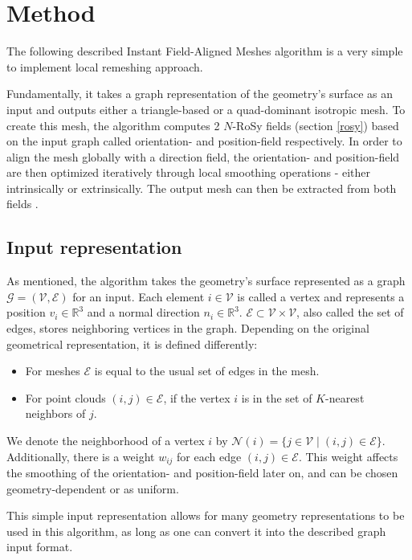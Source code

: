 \documentclass{ACGSeminar}
\begin{document}
\section{Method}\label{algorithm}
The following described Instant Field-Aligned Meshes algorithm is a very simple to implement local remeshing approach.

Fundamentally, it takes a graph representation of the geometry's surface as an input and outputs either a triangle-based or a quad-dominant isotropic mesh. To create this mesh, the algorithm computes 2 $N$-RoSy fields (section \ref{rosy}) based on the input graph called orientation- and position-field respectively. In order to align the mesh globally with a direction field, the orientation- and position-field are then optimized iteratively through local smoothing operations - either intrinsically or extrinsically. The output mesh can then be extracted from both fields \cite{jakob2015instant}.

\subsection{Input representation}
As mentioned, the algorithm takes the geometry's surface represented as a graph $\mathcal{G} = (\mathcal{V}, \mathcal{E})$ for an input. Each element $i \in \mathcal{V}$ is called a vertex and represents a position $v_i \in \mathbb{R}^3$ and a normal direction $n_i \in \mathbb{R}^3$. $\mathcal{E} \subset \mathcal{V} \times \mathcal{V}$, also called the set of edges, stores neighboring vertices in the graph. Depending on the original geometrical representation, it is defined differently:
\begin{itemize}
	\item	For meshes $\mathcal{E}$ is equal to the usual set of edges in the mesh.
	\item	For point clouds $(i,j) \in \mathcal{E}$, if the vertex $i$ is in the set of $K$-nearest neighbors of $j$.
\end{itemize}
We denote the neighborhood of a vertex $i$ by $\mathcal{N}(i) = \{j \in \mathcal{V} \mid (i,j) \in \mathcal{E}\}$. Additionally, there is a weight $w_{ij}$ for each edge $(i,j) \in \mathcal{E}$. This weight affects the smoothing of the orientation- and position-field later on, and can be chosen geometry-dependent or as uniform.\bigskip

This simple input representation allows for many geometry representations to be used in this algorithm, as long as one can convert it into the described graph input format.
\end{document}
